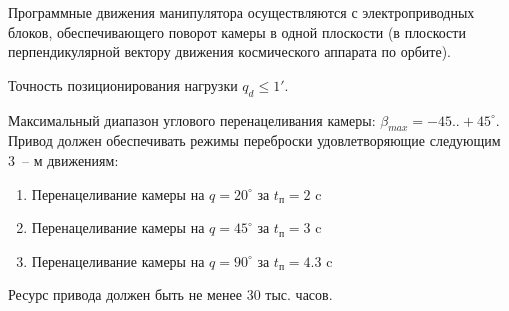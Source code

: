 Программные движения манипулятора осуществляются с электроприводных блоков,
обеспечивающего поворот камеры в одной плоскости (в плоскости перпендикулярной
вектору движения космического аппарата по орбите).

Точность позиционирования нагрузки $q_d \le 1'$.

Максимальный диапазон углового перенацеливания камеры: $\beta_{max} = -45..+45^\circ$.
Привод должен обеспечивать режимы переброски удовлетворяющие следующим 3~-- м движениям:

\begin{enumerate}
    \item Перенацеливание камеры на $q = 20^\circ$ за $t_{\textit{п}} = 2  $ c
    \item Перенацеливание камеры на $q = 45^\circ$ за $t_{\textit{п}} = 3  $ c
    \item Перенацеливание камеры на $q = 90^\circ$ за $t_{\textit{п}} = 4.3$ c
\end{enumerate}

Ресурс привода должен быть не менее 30 тыс. часов.

